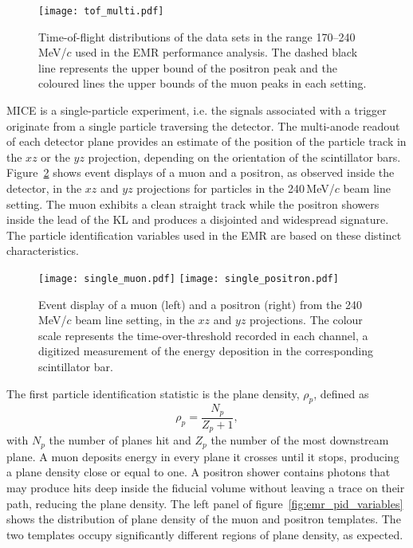 \begin{figure}[htb!]
	\begin{center}
		\texttt{[image: tof\_multi.pdf]}  		
		\caption{Time-of-flight distributions of the data sets in the range 170--240\,MeV/$c$ used in the EMR performance analysis. The dashed black line represents the upper bound of the positron peak and the coloured lines the upper bounds of the muon peaks in each setting.}
		\label{fig:emr_analysis_tof}
	\end{center}
\end{figure}

MICE is a single-particle experiment, i.e. the signals associated with a trigger originate from a single particle traversing the detector. The multi-anode readout of each detector plane provides an estimate of the position of the particle track in the $xz$ or the $yz$ projection, depending on the orientation of the scintillator bars. Figure~\ref{fig:emr_emu_events} shows event displays of a muon and a positron, as observed inside the detector, in the $xz$ and $yz$ projections for particles in the 240\,MeV/$c$ beam line setting. The muon exhibits a clean straight track while the positron showers inside the lead of the KL and produces a disjointed and widespread signature. The particle identification variables used in the EMR are based on these distinct characteristics.

\begin{figure}[htb!]
	\begin{center}
		\texttt{[image: single\_muon.pdf]}
		\hfill
		\texttt{[image: single\_positron.pdf]}
		\caption{Event display of a muon (left) and a positron (right) from the 240\,MeV/$c$ beam line setting, in the $xz$ and $yz$ projections. The colour scale represents the time-over-threshold recorded in each channel, a digitized measurement of the energy deposition in the corresponding scintillator bar.}
		\label{fig:emr_emu_events}
	\end{center}
\end{figure}

The first particle identification statistic is the plane density, $\rho_p$, defined as
\begin{equation}
\rho_p = \frac{N_p}{Z_p+1},
\end{equation}
with $N_p$ the number of planes hit and $Z_p$ the number of the most downstream plane. A muon deposits energy in every plane it crosses until it stops, producing a plane density close or equal to one. A positron shower contains photons that may produce hits deep inside the fiducial volume without leaving a trace on their path, reducing the plane density. The left panel of figure~\ref{fig:emr_pid_variables} shows the distribution of plane density of the muon and positron templates. The two templates occupy significantly different regions of plane density, as expected.


